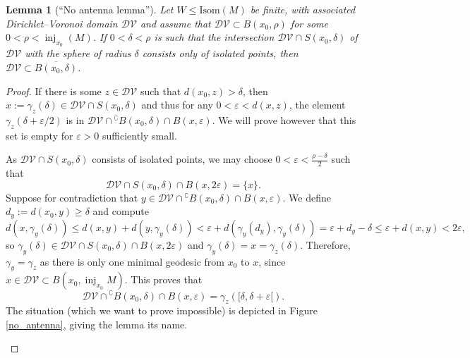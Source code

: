 \documentclass[11pt,twoside]{amsart}
\theoremstyle{plain}
\newtheorem{lem}[prop]{Lemma}
\DeclareMathOperator\inj{inj}
\begin{document}
\begin{lem}[``No antenna lemma'']\label{isolated_max}
Let $W\le\mathrm{Isom}(M)$ be finite, with associated Dirichlet--Voronoi domain $\mathcal{DV}$ and assume that $\mathcal{DV}\subset B(x_0,\rho)$ for some $0<\rho<\inj_{x_0}(M)$. If $0<\delta<\rho$ is such that the intersection $\mathcal{DV}\cap S(x_0,\delta)$ of $\mathcal{DV}$ with the sphere of radius $\delta$ consists only of isolated points, then $\mathcal{DV}\subset\overline{B(x_0,\delta)}$.
\end{lem}

\begin{proof}
If there is some $z\in\mathcal{DV}$ such that $d(x_0,z)>\delta$, then $x:=\gamma_z(\delta)\in\mathcal{DV}\cap S(x_0,\delta)$ and thus for any $0<\varepsilon<d(x,z)$, the element $\gamma_z(\delta+\varepsilon/2)$ is in $\mathcal{DV}\cap{}^{\complement}{B(x_0,\delta)}\cap B(x,\varepsilon)$. We will prove however that this set is empty for $\varepsilon>0$ sufficiently small.

As $\mathcal{DV}\cap S(x_0,\delta)$ consists of isolated points, we may choose $0<\varepsilon<\tfrac{\rho-\delta}{2}$ such that 
\[\mathcal{DV}\cap S(x_0,\delta)\cap B(x,2\varepsilon)=\{x\}.\]
Suppose for contradiction that $y\in\mathcal{DV}\cap{}^{\complement}{B(x_0,\delta)}\cap B(x,\varepsilon)$. We define $d_y:=d(x_0,y)\ge\delta$ and compute
\[d(x,\gamma_y(\delta))\le d(x,y)+d(y,\gamma_y(\delta))<\varepsilon+d(\gamma_y(d_y),\gamma_y(\delta))=\varepsilon+d_y-\delta\le\varepsilon+d(x,y)<2\varepsilon,\]
so $\gamma_y(\delta)\in\mathcal{DV}\cap S(x_0,\delta)\cap B(x,2\varepsilon)$ and $\gamma_y(\delta)=x=\gamma_z(\delta)$. Therefore, $\gamma_y=\gamma_z$ as there is only one minimal geodesic from $x_0$ to $x$, since $x\in\mathcal{DV}\subset B(x_0,\inj_{x_0}\!M)$. This proves that
\[\mathcal{DV}\cap{}^{\complement}{B(x_0,\delta)}\cap B(x,\varepsilon)=\gamma_z([\delta,\delta+\varepsilon[).\]
The situation (which we want to prove impossible) is depicted in Figure \ref{no_antenna}, giving the lemma its name.
\begin{figure}
\centering
{}
\end{figure}
\end{proof}
\end{document}
